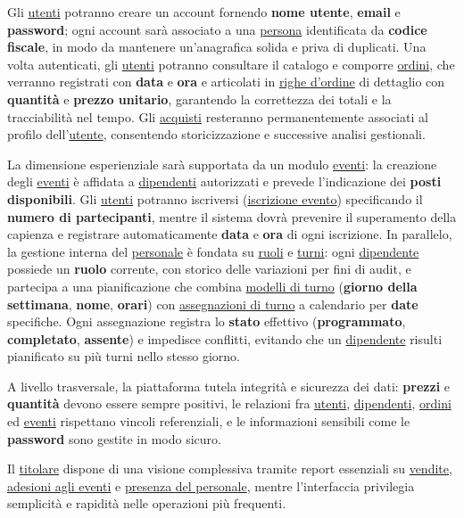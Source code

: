 \documentclass[a4paper,12pt]{report}
\begin{document}
Gli \underline{utenti} potranno creare un account fornendo \textbf{nome utente}, \textbf{email} 
e \textbf{password}; ogni account sarà associato a una \underline{persona} identificata da 
\textbf{codice fiscale}, in modo da mantenere un'anagrafica solida e priva di duplicati. Una 
volta autenticati, gli \underline{utenti} potranno consultare il catalogo e comporre 
\underline{ordini}, che verranno registrati con \textbf{data} e \textbf{ora} e articolati in 
\underline{righe d'ordine} di dettaglio con \textbf{quantità} e \textbf{prezzo unitario}, 
garantendo la correttezza dei totali e la tracciabilità nel tempo. Gli \underline{acquisti} 
resteranno permanentemente associati al profilo dell'\underline{utente}, consentendo 
storicizzazione e successive analisi gestionali.

La dimensione esperienziale sarà supportata da un modulo \underline{eventi}: la creazione degli 
\underline{eventi} è affidata a \underline{dipendenti} autorizzati e prevede l'indicazione dei 
\textbf{posti disponibili}. Gli \underline{utenti} potranno iscriversi (\underline{iscrizione 
evento}) specificando il \textbf{numero di partecipanti}, mentre il sistema dovrà prevenire 
il superamento della capienza e registrare automaticamente \textbf{data} e \textbf{ora} di ogni 
iscrizione. In parallelo, la gestione interna del \underline{personale} è fondata su 
\underline{ruoli} e \underline{turni}: ogni \underline{dipendente} possiede un \textbf{ruolo} 
corrente, con storico delle variazioni per fini di audit, e partecipa a una pianificazione che 
combina \underline{modelli di turno} (\textbf{giorno della settimana}, \textbf{nome}, 
\textbf{orari}) con \underline{assegnazioni di turno} a calendario per \textbf{date} specifiche. 
Ogni assegnazione registra lo \textbf{stato} effettivo (\textbf{programmato}, 
\textbf{completato}, \textbf{assente}) e impedisce conflitti, evitando che un 
\underline{dipendente} risulti pianificato su più turni nello stesso giorno.

A livello trasversale, la piattaforma tutela integrità e sicurezza dei dati: \textbf{prezzi} e 
\textbf{quantità} devono essere sempre positivi, le relazioni fra \underline{utenti}, 
\underline{dipendenti}, \underline{ordini} ed \underline{eventi} rispettano vincoli 
referenziali, e le informazioni sensibili come le \textbf{password} sono gestite in modo sicuro. 

Il \underline{titolare} dispone di una visione complessiva tramite report essenziali su 
\underline{vendite}, \underline{adesioni agli eventi} e \underline{presenza del personale}, 
mentre l'interfaccia privilegia semplicità e rapidità nelle operazioni più frequenti.
\end{document}
